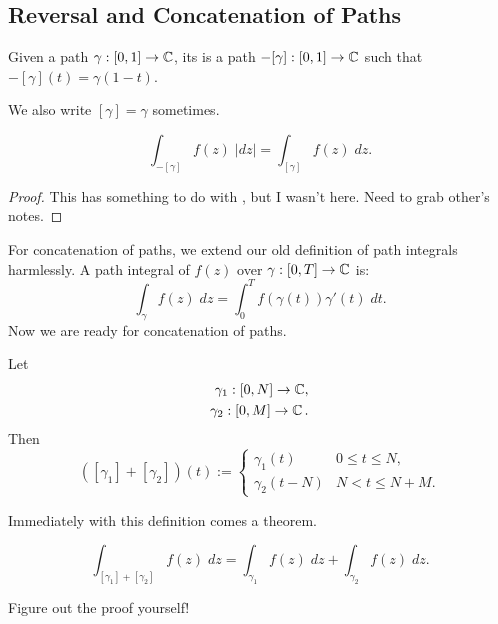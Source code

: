 \documentclass[notes]{subfile}
\begin{document}
\subsection{Reversal and Concatenation of Paths}

\begin{definition}
    Given a path $\gamma : [0,1] \to \operatorname{\mathbb{C}}$, its 
    is a path $-[\gamma] : [0,1] \to \operatorname{\mathbb{C}}$ such that 
    $-[\gamma](t) = \gamma(1-t)$.
\end{definition}
We also write $[\gamma] = \gamma$ sometimes.

\begin{theorem}
    \[ \int_{-[\gamma]} f(z) \; |dz| = \int_{[\gamma]} f(z) \; dz. \]
\end{theorem}

\begin{proof}
    This has something to do with , but I wasn't
    here. 
    Need to grab other's notes.
\end{proof}

For concatenation of paths, we extend our old definition of
path integrals harmlessly.
A path integral of $f(z)$ over $\gamma : [0,T] \to \operatorname{\mathbb{C}}$ is:
\[ \int_{\gamma} f(z) \; dz = \int_0^T f(\gamma(t)) \gamma'(t) \; dt. \]
Now we are ready for concatenation of paths.

\begin{definition}
    Let 
    \begin{align*}
        \gamma_1 : [0,N] \to \operatorname{\mathbb{C}}, \\
        \gamma_2 : [0,M] \to \operatorname{\mathbb{C}}.
    \end{align*}
    Then 
    \[ ([\gamma_1] + [\gamma_2])(t) := 
        \begin{cases}
            \gamma_1(t) & 0 \le t \le N, \\
            \gamma_2(t-N) & N < t \le N+M.
        \end{cases}
    \]
\end{definition}

Immediately with this definition comes a theorem.
\begin{theorem}
    \[ \int_{[\gamma_1] + [\gamma_2]} f(z) \; dz =
    \int_{\gamma_1} f(z) \; dz + \int_{\gamma_2} f(z) \; dz. \]
\end{theorem}

Figure out the proof yourself!
\end{document}
